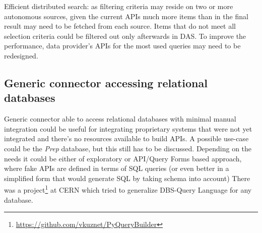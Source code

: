 \documentclass[a4paper,11pt,draft]{article}
\begin{document}
\begin{compactitem}
					
					\item Efficient distributed search: as filtering criteria may reside on two or more autonomous sources, given the current APIs much more items than in the final result may need to be fetched from each source. Items that do not meet all selection criteria could be filtered out only afterwards in DAS. To improve the performance, data provider's APIs for the most used queries may need to be redesigned.
\end{compactitem}


\subsection{Generic connector accessing relational databases}
{\color{red}Generic connector able to access relational databases with minimal manual integration could be useful for integrating proprietary systems that were not yet integrated and there's no resources available to build APIs. A possible use-case could be the \textit{Prep} database, but this still has to be discussed. 
%
Depending on the needs it could be either of exploratory or API/Query Forms based approach, where fake APIs are defined in terms of SQL queries (or even better in a simplified form that would generate SQL by taking schema into account)}
{
There was a project\footnote{\url{https://github.com/vkuznet/PyQueryBuilder}}   at CERN which tried to generalize DBS-Query Language for any database.}








\end{document}

